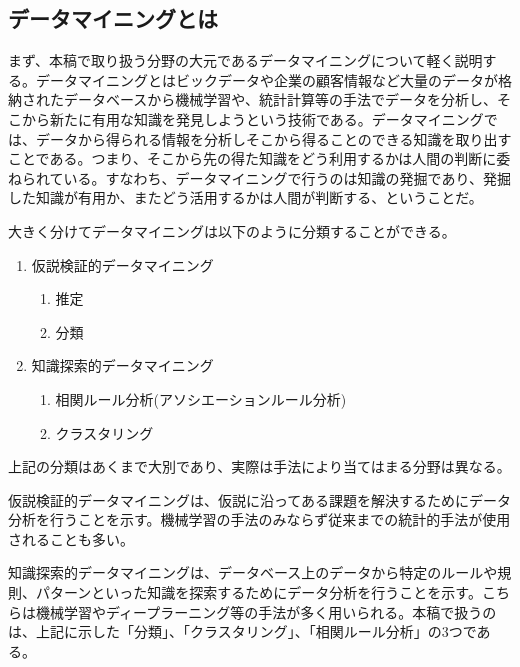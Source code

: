 \documentclass[dvipdfmx]{jsarticle}
\begin{document}
\subsection{データマイニングとは}
まず、本稿で取り扱う分野の大元であるデータマイニングについて軽く説明する。データマイニングとはビックデータや企業の顧客情報など大量のデータが格納されたデータベースから機械学習や、統計計算等の手法でデータを分析し、そこから新たに有用な知識を発見しようという技術である。データマイニングでは、データから得られる情報を分析しそこから得ることのできる知識を取り出すことである。つまり、そこから先の得た知識をどう利用するかは人間の判断に委ねられている。すなわち、データマイニングで行うのは知識の発掘であり、発掘した知識が有用か、またどう活用するかは人間が判断する、ということだ。\par
大きく分けてデータマイニングは以下のように分類することができる。
\begin{enumerate}
  \item 仮説検証的データマイニング
  \begin{enumerate}
    \item 推定
    \item 分類
  \end{enumerate}
  \item 知識探索的データマイニング
  \begin{enumerate}
    \item 相関ルール分析(アソシエーションルール分析)
    \item クラスタリング
  \end{enumerate}
\end{enumerate}
上記の分類はあくまで大別であり、実際は手法により当てはまる分野は異なる。\par
仮説検証的データマイニングは、仮説に沿ってある課題を解決するためにデータ分析を行うことを示す。機械学習の手法のみならず従来までの統計的手法が使用されることも多い。\par
知識探索的データマイニングは、データベース上のデータから特定のルールや規則、パターンといった知識を探索するためにデータ分析を行うことを示す。こちらは機械学習やディープラーニング等の手法が多く用いられる。本稿で扱うのは、上記に示した「分類」、「クラスタリング」、「相関ルール分析」の3つである。
\end{document}
